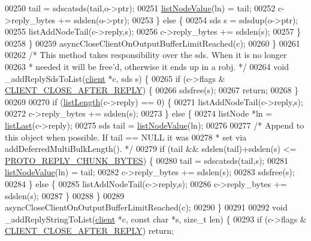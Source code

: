 \begin{DoxyCode}
00250             tail = sdscatsds(tail,o->ptr);
00251             \hyperlink{adlist_8h_af84cae230e7180ebcda1e2736fce9f65}{listNodeValue}(ln) = tail;
00252             c->reply\_bytes += sdslen(o->ptr);
00253         \} \textcolor{keywordflow}{else} \{
00254             sds s = sdsdup(o->ptr);
00255             listAddNodeTail(c->reply,s);
00256             c->reply\_bytes += sdslen(s);
00257         \}
00258     \}
00259     asyncCloseClientOnOutputBufferLimitReached(c);
00260 \}
00261 
00262 \textcolor{comment}{/* This method takes responsibility over the sds. When it is no longer}
00263 \textcolor{comment}{ * needed it will be free'd, otherwise it ends up in a robj. */}
00264 \textcolor{keywordtype}{void} \_addReplySdsToList(\hyperlink{structclient}{client} *c, sds s) \{
00265     \textcolor{keywordflow}{if} (c->flags & \hyperlink{server_8h_a8cff2154afcc2e87ac85bdbbe2814091}{CLIENT\_CLOSE\_AFTER\_REPLY}) \{
00266         sdsfree(s);
00267         \textcolor{keywordflow}{return};
00268     \}
00269 
00270     \textcolor{keywordflow}{if} (\hyperlink{adlist_8h_afde0ab079f934670e82119b43120e94b}{listLength}(c->reply) == 0) \{
00271         listAddNodeTail(c->reply,s);
00272         c->reply\_bytes += sdslen(s);
00273     \} \textcolor{keywordflow}{else} \{
00274         listNode *ln = \hyperlink{adlist_8h_a5e0fad60032ef0fe9adcf9811e2f2fba}{listLast}(c->reply);
00275         sds tail = \hyperlink{adlist_8h_af84cae230e7180ebcda1e2736fce9f65}{listNodeValue}(ln);
00276 
00277         \textcolor{comment}{/* Append to this object when possible. If tail == NULL it was}
00278 \textcolor{comment}{         * set via addDeferredMultiBulkLength(). */}
00279         \textcolor{keywordflow}{if} (tail && sdslen(tail)+sdslen(s) <= \hyperlink{server_8h_ab467e0a40be9097e85445616d9bb32e3}{PROTO\_REPLY\_CHUNK\_BYTES}) \{
00280             tail = sdscatsds(tail,s);
00281             \hyperlink{adlist_8h_af84cae230e7180ebcda1e2736fce9f65}{listNodeValue}(ln) = tail;
00282             c->reply\_bytes += sdslen(s);
00283             sdsfree(s);
00284         \} \textcolor{keywordflow}{else} \{
00285             listAddNodeTail(c->reply,s);
00286             c->reply\_bytes += sdslen(s);
00287         \}
00288     \}
00289     asyncCloseClientOnOutputBufferLimitReached(c);
00290 \}
00291 
00292 \textcolor{keywordtype}{void} \_addReplyStringToList(\hyperlink{structclient}{client} *c, \textcolor{keyword}{const} \textcolor{keywordtype}{char} *s, size\_t len) \{
00293     \textcolor{keywordflow}{if} (c->flags & \hyperlink{server_8h_a8cff2154afcc2e87ac85bdbbe2814091}{CLIENT\_CLOSE\_AFTER\_REPLY}) \textcolor{keywordflow}{return};

\end{DoxyCode}
